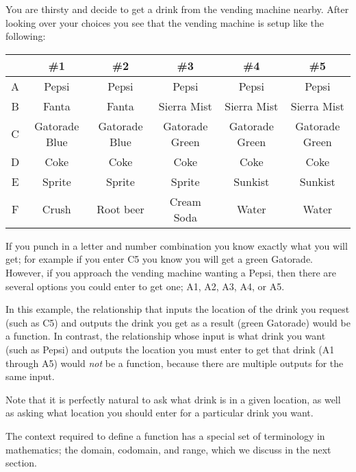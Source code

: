 \documentclass{ximeraXloud}
\begin{document}
    \begin{explanation}%
        You are thirsty and decide to get a drink from the vending machine nearby. After looking over your choices you see that the vending machine is setup like the following:
    
        \begin{tabular}{c|ccccc}
                & \#1           & \#2           & \#3           & \#4           & \#5           \\ \hline
            A   & Pepsi         & Pepsi         & Pepsi         & Pepsi         & Pepsi         \\
            B   & Fanta         & Fanta         & Sierra Mist   & Sierra Mist   & Sierra Mist   \\
            C   & Gatorade Blue & Gatorade Blue & Gatorade Green& Gatorade Green& Gatorade Green\\
            D   & Coke          & Coke          & Coke          & Coke          & Coke          \\
            E   & Sprite        & Sprite        & Sprite        & Sunkist       & Sunkist       \\
            F   & Crush         & Root beer     & Cream Soda    & Water         & Water         \\
        \end{tabular}
    
        If you punch in a letter and number combination you know exactly what you will get; for example if you enter C5 you know you will get a green Gatorade. However, if you approach the vending machine wanting a Pepsi, then there are several options you could enter to get one; A1, A2, A3, A4, or A5.
        
        In this example, the relationship that inputs the location of the drink you request (such as C5) and outputs the drink you get as a result (green Gatorade) would be a function. In contrast, the relationship whose input is what drink you want (such as Pepsi) and outputs the location you must enter to get that drink (A1 through A5) would \textit{not} be a function, because there are multiple outputs for the same input.
        
        Note that it is perfectly natural to ask what drink is in a given location, as well as asking what location you should enter for a particular drink you want.
    
    \end{explanation}%
    
    The context required to define a function has a special set of terminology in mathematics; the domain, codomain, and range, which we discuss in the next section.
\end{document}
